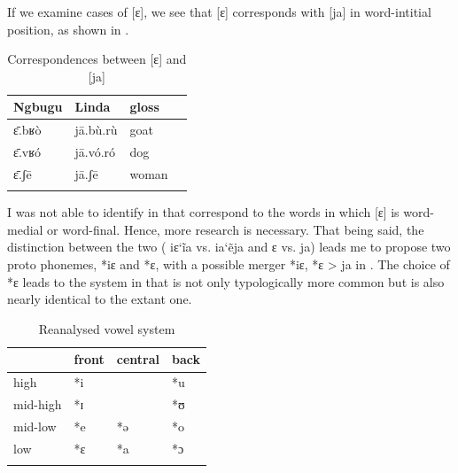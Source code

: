 \documentclass[output=paper,colorlinks,citecolor=brown]{langscibook}
\begin{document}
If we examine cases of [ɛ], we see that  [ɛ] corresponds with  [ja] \citep{Moñino1988} in word-intitial position, as shown in .

\begin{table}
\caption{Correspondences between  [ɛ] and  [ja]}
\label{tab:olson:13}
    \begin{tabularx}{0.8\textwidth}{XXXX}
    \lsptoprule
        Ngbugu & Linda & gloss\\
    \midrule
        ɛ̄.bʁò       & jā.bù.rù  & goat\\
        ɛ̄.vʁó       & jā.vó.ró & dog\\
        ɛ̄.ʃē        & jā.ʃē    & woman\\
    \lspbottomrule
 \end{tabularx}
\end{table}

I was not able to identify  in  that correspond to the  words in which [ɛ] is word-medial or word-final. Hence, more research is necessary. That being said, the distinction between the two  ( iɛ\char`\~ia vs.  ia\char`\~eja and  ɛ vs.  ja) leads me to propose two proto phonemes, *iɛ and *ɛ, with a possible merger *iɛ, *ɛ > ja in . The choice of *ɛ leads to the  system in  that is not only typologically  more common but is also nearly identical to the extant  one.

\begin{table}
\caption{Reanalysed  vowel system}
\label{tab:olson:14}
 \begin{tabularx}{0.8\textwidth}{XXXX}
    \lsptoprule
                    & front & central   & back\\
    \midrule
        high        & *i    &           & *u\\
        mid-high    & *ɪ    &           & *ʊ\\
        mid-low     & *e    & *ə        & *o\\
        low         & *ɛ    & *a        & *ɔ\\
    \lspbottomrule
    \end{tabularx}
\end{table}
\end{document}
